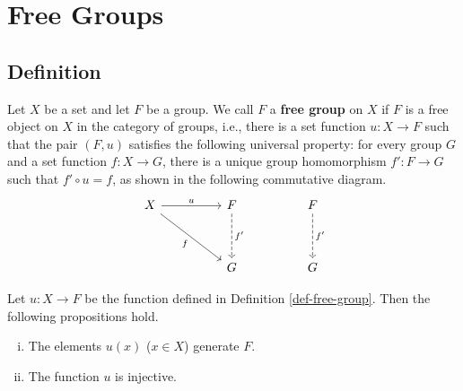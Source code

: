 \section{Free Groups}
\subsection{Definition}
\begin{definition} \label{def-free-group}
	Let $X$ be a set and let $F$ be a group. We call $F$ a \textbf{free group} on $X$ if $F$ is a free object on $X$ in the category of groups, i.e., there is a set function $u:X\rightarrow F$ such that the pair $(F,u)$ satisfies the following universal property: for every group $G$ and a set function $f:X\rightarrow G$, there is a unique group homomorphism $f':F\rightarrow G$ such that $f'\circ u = f$, as shown in the following commutative diagram.
	\[\begin{tikzcd}
		X && F && F \\
		\\
		&& G && G
		\arrow["u", from=1-1, to=1-3]
		\arrow["f"', from=1-1, to=3-3]
		\arrow["{f'}", dashed, from=1-3, to=3-3]
		\arrow["{f'}", dashed, from=1-5, to=3-5]
	\end{tikzcd}\]
\end{definition}
\begin{proposition}
	Let $u:X\rightarrow F$ be the function defined in Definition \ref{def-free-group}. Then the following propositions hold.
	\begin{enumerate}[(i)]
		\item The elements $u(x)$ ($x\in X$) generate $F$.
		\item The function $u$ is injective.
	\end{enumerate}
\end{proposition}
